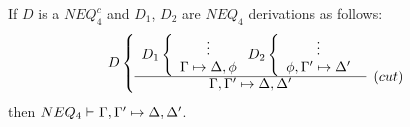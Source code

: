 
\begin{CLAIM}\label{le:elcut}
If $D$ is a $NEQ_4^c$ and $D_1$, $D_2$ are $NEQ_4$ derivations as follows:
\[ D\left\{ \begin{array}{cl}
 D_1\left\{ \begin{array}{c}
  \vdots \\   \Gamma\Seq\Delta, \phi
 \end{array} \right.
 D_2\left\{ \begin{array}{c}
  \vdots \\   \phi, \Gamma'\Seq\Delta'
 \end{array} \right. \\ \cline{1-1}
\Gamma,\Gamma' \Seq \Delta,\Delta'
&   \raisebox{1.2ex}[1.5ex][0ex]{$(cut)$}
\end{array}\right. \]
then ${NEQ_4}\vdash^{{}}\Gamma,\Gamma'\mathrel{\mapsto}\Delta,\Delta'$.
\end{CLAIM}
